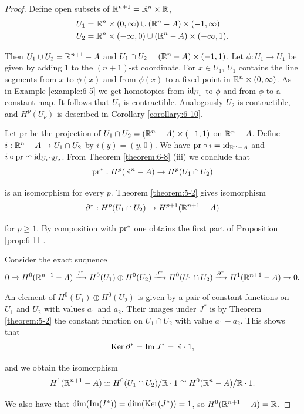 \begin{proof}
  Define open subsets of ${\mathbb{R}}^{n+1} = {\mathbb{R}}^n\times{\ensuremath{\mathbb{R}}}$,
  \begin{align*}
    U_1 & = {\mathbb{R}}^n \times (0, \infty)\cup ({\mathbb{R}}^n-A)\times(-1, \infty)\\
    U_2 & = {\mathbb{R}}^n \times (-\infty, 0)\cup ({\mathbb{R}}^n-A)\times(-\infty, 1).
  \end{align*}

  Then $U_1\cup U_2 = {\mathbb{R}}^{n+1} - A$ and $U_1\cap U_2 = ({\mathbb{R}}^n - A)\times(-1,1)$. 
  Let $\phi: U_1\to U_1$ be given by adding 1 to the $(n + 1)$-st coordinate. For $x\in U_1$, $U_1$ contains the
line segments from $x$ to $\phi(x)$ and from $\phi(x)$ to a fixed point in ${\mathbb{R}}^n\times (0, \infty)$. As
in Example \ref{example:6-5} we get homotopies from $\operatorname{id}_{U_1}$ to $\phi$ and from $\phi$ to a constant map.
It follows that $U_1$ is contractible. Analogously $U_2$ is contractible, and $H^p(U_\nu)$ is
described in Corollary \ref{corollary:6-10}.

Let pr be the projection of $U_1\cap U_2 = ({\mathbb{R}}^n-A)\times(-1, 1)$ on ${\mathbb{R}}^n - A$. Define $i:{\mathbb{R}}^n-A\to U_1\cap U_2$ 
by $i(y) = (y, 0)$. We have $\mathrm{pr}\circ i = \operatorname{id}_{{\mathbb{R}}^n-A}$ and $i\circ\mathrm{pr}\backsimeq\operatorname{id}_{U_1\cap U_2}$. From Theorem \ref{theorem:6-8}
(iii) we conclude that 
\begin{align*}
  \mathrm{pr}^*: H^p({\mathbb{R}}^n - A)\to H^p(U_1\cap U_2)
\end{align*}

is an isomorphism for every $p$. Theorem \ref{theorem:5-2} gives isomorphism
\begin{align*}
  \partial^*: H^p(U_1\cap U_2)\to H^{p+1}({\mathbb{R}}^{n+1} - A)
\end{align*}

for $p\ge 1$. By composition with $\mathrm{pr}^*$ one obtains the first part of Proposition \ref{prop:6-11}.

Consider the exact suquence
\begin{align*}
  0\xra[]H^0(\RR^{n+1}-A)\xra[I^*]H^0(U_1)\oplus H^0(U_2)\xra[J^*]H^0(U_1\cap U_2)\xra[\partial^*] 
  H^1(\RR^{n+1}-A)\xra[]0.
\end{align*}

An element of $H^0(U_1)\oplus H^0(U_2)$ is given by a pair of constant functions on $U_1$ and $U_2$ with values $a_1$ and $a_2$. 
Their images under $J^*$ is by Theorem \ref{theorem:5-2} the constant function on $U_1\cap U_2$ with value $a_1 - a_2$. This shows 
that 
\begin{align*}
  \operatorname{Ker}\partial^* = \operatorname{Im} J^* = {\mathbb{R}}\cdot 1,
\end{align*}

and we obtain the isomorphism
\begin{align*}
  H^1({\mathbb{R}}^{n+1}-A) \backsimeq H^0(U_1\cap U_2)/{{\mathbb{R}}\cdot 1}
  \cong H^0({\mathbb{R}}^n - A)/{\mathbb{R}}\cdot 1.
\end{align*}

We also have that $\dim(\operatorname{Im}(I^*)) = \dim(\operatorname{Ker}(J^*)) = 1$, so $H^0({\mathbb{R}}^{n+1}-A) = {\mathbb{R}}$. 
\end{proof}


